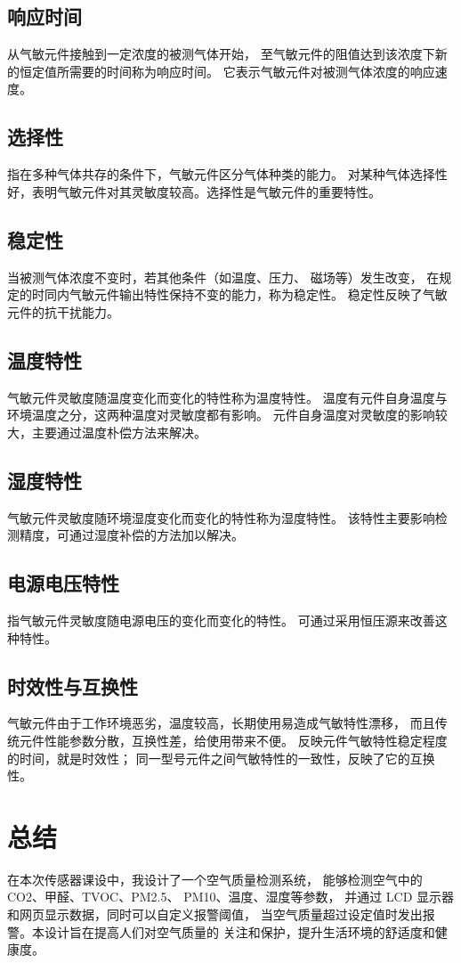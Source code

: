 \documentclass[12pt,hyperref,a4paper,UTF8]{ctexart}
\begin{document}
\subsection{响应时间}
从气敏元件接触到一定浓度的被测气体开始，
至气敏元件的阻值达到该浓度下新的恒定值所需要的时间称为响应时间。
它表示气敏元件对被测气体浓度的响应速度。
\subsection{选择性}
指在多种气体共存的条件下，气敏元件区分气体种类的能力。
对某种气体选择性好，表明气敏元件对其灵敏度较高。选择性是气敏元件的重要特性。
\subsection{稳定性}
当被测气体浓度不变时，若其他条件（如温度、压力、 磁场等）发生改变，
在规定的时同内气敏元件输出特性保持不变的能力，称为稳定性。
稳定性反映了气敏元件的抗干扰能力。
\subsection{温度特性}
气敏元件灵敏度随温度变化而变化的特性称为温度特性。
温度有元件自身温度与环境温度之分，这两种温度对灵敏度都有影响。
元件自身温度对灵敏度的影响较大，主要通过温度朴偿方法来解决。
\subsection{湿度特性}
气敏元件灵敏度随环境湿度变化而变化的特性称为湿度特性。
该特性主要影响检测精度，可通过湿度补偿的方法加以解决。
\subsection{电源电压特性}
指气敏元件灵敏度随电源电压的变化而变化的特性。
可通过采用恒压源来改善这种特性。
\subsection{时效性与互换性}
气敏元件由于工作环境恶劣，温度较高，长期使用易造成气敏特性漂移，
而且传统元件性能参数分散，互换性差，给使用带来不便。
反映元件气敏特性稳定程度的时间，就是时效性；
同一型号元件之间气敏特性的一致性，反映了它的互换性。

\section{总结}
在本次传感器课设中，我设计了一个空气质量检测系统，
能够检测空气中的 CO2、甲醛、TVOC、PM2.5、 PM10、温度、湿度等参数，
并通过 LCD 显示器和网页显示数据，同时可以自定义报警阈值，
当空气质量超过设定值时发出报警。本设计旨在提高人们对空气质量的
关注和保护，提升生活环境的舒适度和健康度。
\end{document}
